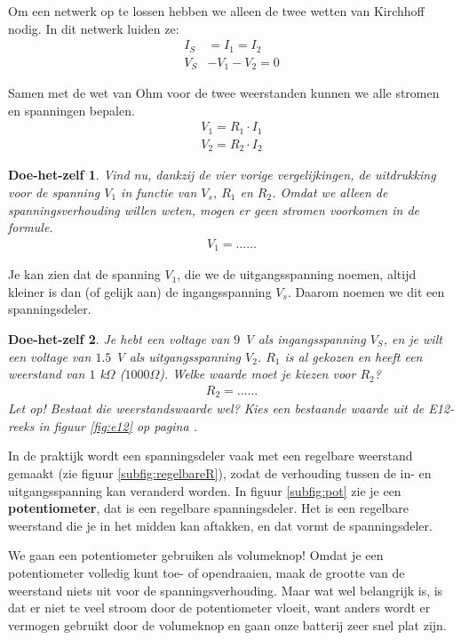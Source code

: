 \documentclass{article}
\newtheorem{DIY}{Doe-het-zelf}
\begin{document}
			Om een netwerk op te lossen hebben we alleen de twee wetten van Kirchhoff nodig. In dit netwerk luiden ze:
			\begin{align}
			    I_S &= I_1 = I_2 \\
			    V_S &- V_1 -V_2 = 0 
			\end{align}

			Samen met de wet van Ohm voor de twee weerstanden kunnen we alle stromen en spanningen bepalen.
			\begin{align}
			    V_1 = R_1 \cdot I_1 \\
			    V_2 = R_2 \cdot I_2
			\end{align}

			\begin{DIY} Vind nu, dankzij de vier vorige vergelijkingen, de uitdrukking voor de spanning $V_1$ in functie van $V_s$, $R_1$ en $R_2$. Omdat we alleen de spanningsverhouding willen weten, mogen er geen stromen voorkomen in de formule.
			\begin{align*}
			    V_1 = \ldots\ldots
			\end{align*}
			\end{DIY}
			Je kan zien dat de spanning $V_1$, die we de uitgangsspanning noemen, altijd kleiner is dan (of gelijk aan) de ingangsspanning $V_s$. Daarom noemen we dit een spanningsdeler.
			\begin{DIY}Je hebt een voltage van $9$ V als ingangsspanning $V_S$, en je wilt een voltage van $1.5$ V als uitgangsspanning $V_2$. $R_1$ is al gekozen en heeft een weerstand van $1$ k$\Omega$ ($1000 \Omega$). Welke waarde moet je kiezen voor $R_2$?
			\begin{align*}
			    R_2 = \ldots\ldots
			\end{align*}
			Let op! Bestaat die weerstandswaarde wel? Kies een bestaande waarde uit de E12-reeks in figuur \ref{fig:e12} op pagina \pageref{fig:e12}.
			\end{DIY}
			In de praktijk wordt een spanningsdeler vaak met een regelbare weerstand gemaakt (zie figuur \ref{subfig:regelbareR}), zodat de verhouding tussen de in- en uitgangsspanning kan veranderd worden. In figuur \ref{subfig:pot} zie je een \textbf{potentiometer}, dat is een regelbare spanningsdeler. Het is een regelbare weerstand die je in het midden kan aftakken, en dat vormt de spanningsdeler.

			We gaan een potentiometer gebruiken als volumeknop! Omdat je een potentiometer volledig kunt toe- of opendraaien, maak de grootte van de weerstand niets uit voor de spanningsverhouding. Maar wat wel belangrijk is, is dat er niet te veel stroom door de potentiometer vloeit, want anders wordt er vermogen gebruikt door de volumeknop en gaan onze batterij zeer snel plat zijn. 
\end{document}
